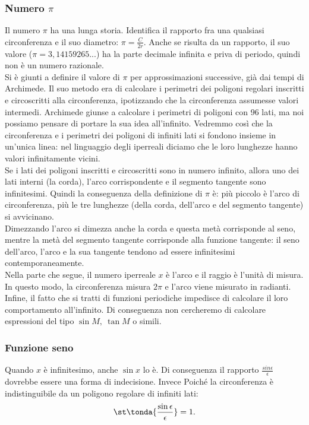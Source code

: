 \subsubsection{Numero $\pi$}
\label{subsubsec:insnum_pigreco}
Il numero $\pi$ ha una lunga storia. Identifica 
il rapporto fra una qualsiasi circonferenza e il suo diametro: 
$\pi=\frac{C}{2r}$. 
Anche se risulta da un rapporto, il suo valore ($\pi=3,14159265...$) 
ha la parte decimale infinita e priva di periodo, quindi non è un numero 
razionale.\\
Si è giunti a definire il valore di \(\pi\) per approssimazioni
successive, già dai tempi di Archimede. Il suo metodo era di
calcolare i perimetri dei poligoni regolari inscritti e
circoscritti alla circonferenza, ipotizzando che la circonferenza
assumesse valori intermedi. Archimede giunse a calcolare i perimetri
di poligoni con 96 lati, ma noi possiamo pensare di portare la sua idea
all'infinito. Vedremmo così che la circonferenza e i perimetri dei poligoni 
di infiniti lati si fondono insieme in un'unica linea: nel linguaggio degli
iperreali diciamo che le loro lunghezze hanno valori infinitamente vicini.\\
Se i lati dei poligoni inscritti e circoscritti sono in numero infinito,
allora uno dei lati interni (la corda), l'arco corrispondente e il segmento 
tangente sono infinitesimi. 
Quindi la conseguenza della definizione di \(\pi\) è:
più piccolo è l'arco di circonferenza, più le tre lunghezze (della corda, 
dell'arco e del segmento tangente) si avvicinano.\\
Dimezzando l'arco si dimezza anche la corda e questa metà corrisponde al seno,
mentre la metà del segmento tangente corrisponde alla funzione tangente:
il seno dell'arco, l'arco e la sua tangente tendono  ad essere 
infinitesimi contemporaneamente.\\
Nella parte che segue, il numero iperreale $x$ è l'arco e il raggio è l'unità 
di misura. In questo modo, la circonferenza misura $2\pi$ e l'arco 
viene misurato in radianti.\\
Infine, il fatto che si tratti di funzioni periodiche impedisce di calcolare
il loro comportamento all'infinito. Di conseguenza non cercheremo di 
calcolare 
espressioni del tipo $\sin M,\ \tan M$ o simili.

\subsubsection{Funzione seno}
\label{subsubsec:insnum_fseno}
Quando $x$ è infinitesimo, anche $\sin x$ lo è. Di conseguenza il rapporto
$\frac{sin\epsilon}{\epsilon}$ dovrebbe essere una forma di indecisione. 
Invece Poiché la circonferenza è indistinguibile da un poligono regolare di 
infiniti lati:
\[
 \st\tonda{\frac{\sin \epsilon}{\epsilon}}=1.
\]

